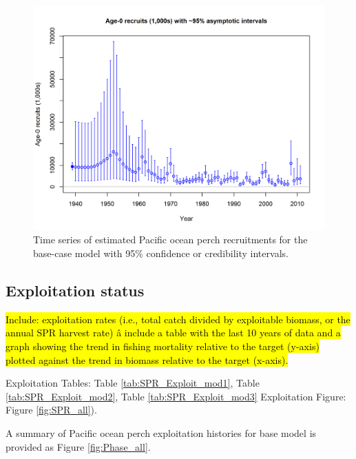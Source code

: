 \documentclass[12pt,]{article}
\begin{document}
\begin{figure}
\centering
\includegraphics{r4ss/plots_mod1/ts11_Age-0_recruits_(1000s)_with_95_asymptotic_intervals.png}
\caption{Time series of estimated Pacific ocean perch recruitments for
the base-case model with 95\% confidence or credibility intervals.
\label{fig:Recruits_all}}
\end{figure}

\FloatBarrier

\subsection*{Exploitation status}\label{exploitation-status}

\hl{Include: exploitation rates (i.e., total catch divided by exploitable biomass, or the annual SPR harvest rate) â include a table with the last 10 years of data and a graph showing the trend in fishing mortality relative to the target (y-axis) plotted against the trend in biomass relative to the target (x-axis).}

Exploitation Tables: Table \ref{tab:SPR_Exploit_mod1}, Table
\ref{tab:SPR_Exploit_mod2}, Table \ref{tab:SPR_Exploit_mod3}
Exploitation Figure: Figure \ref{fig:SPR_all}).

A summary of Pacific ocean perch exploitation histories for base model
is provided as Figure \ref{fig:Phase_all}.

\FloatBarrier
\end{document}
